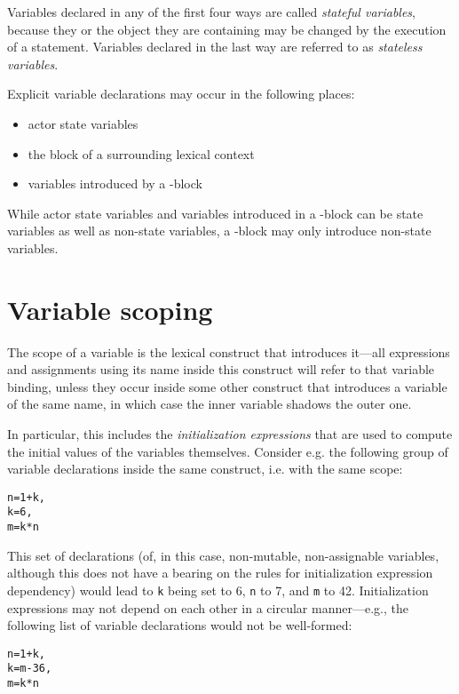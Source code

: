 Variables declared in any of the first four ways are called {\em stateful
  variables}, because they or the object they are containing may be
changed by the execution of a statement. Variables declared in the
last way are referred to as {\em stateless variables}.

Explicit variable declarations may occur in the following places:
\begin{itemize}
\item actor state variables
\item the \kwVar block of a surrounding lexical context
\item variables introduced by a \kwLet-block
\end{itemize}

While actor state variables and variables introduced in a
\kwVar-block can be state variables as well as non-state variables, a
 \kwLet-block may only introduce non-state variables.


\section{Variable scoping}\label{sect:VariableScoping}

 


The scope of a variable is the lexical
construct that introduces it---all expressions and assignments using
its name inside this construct will refer to that variable binding,
unless they occur inside some other construct that introduces a
 variable of the same name, in which case the inner variable shadows
the outer one.



In particular, this includes the  {\em
  initialization expressions} that are used to compute the initial
values of the variables themselves. Consider e.g. the following group
of variable declarations inside the same construct, i.e. with the same
scope:
\begin{alltt}
  n = 1 + k,
  k = 6,
  m = k * n
\end{alltt}
This set of declarations (of, in this case, non-mutable,
non-assignable variables, although this does not have a bearing on the rules for
initialization expression dependency) would lead to {\tt k} being set
to 6, {\tt n} to 7, and {\tt m} to 42. Initialization expressions may
not depend on each other in a circular manner---e.g., the following
list of variable declarations would not be well-formed:
\begin{alltt}
  n = 1 + k,
  k = m - 36,
  m = k * n
\end{alltt}

